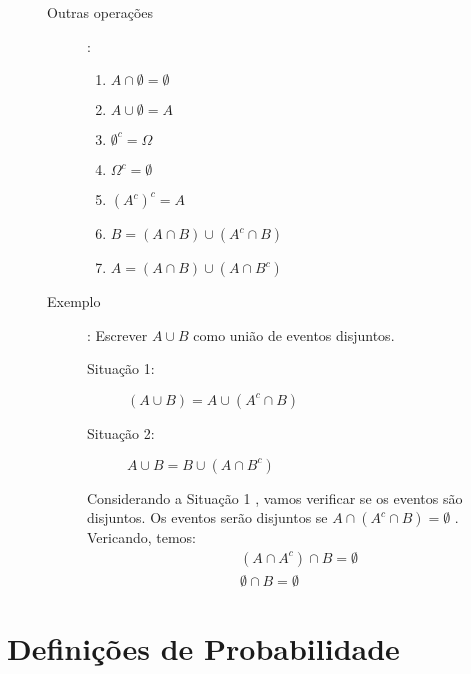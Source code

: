 \begin{description}
\begin{description}
\begin{enumerate}[align=left,label=({\alph*}) ]
      \end{enumerate}

    \item [Outras operações]: 

      \begin{enumerate}[leftmargin=*, label=\Roman*., widest=IV, align=left]
        \item     $A \cap \emptyset= \emptyset$ 
        \item     $A \cup \emptyset = A$ 
        \item     $\emptyset^{c} = \Omega$ 
        \item     $ \Omega^c = \emptyset$ 
        \item     $(A^c)^c = A$ 
        \item     $B= (A \cap B)\cup (A^c \cap B)$
        \item     $A= (A \cap B) \cup (A \cap B^c)$
      \end{enumerate}
    \item [Exemplo]: Escrever $A \cup B$ como união de eventos disjuntos.

      \begin{figure}[H]
        \centering
        
        \caption{}
        \label{fig:11}
      \end{figure}
      \begin{description}
        \item [Situação 1:]

          $(A \cup B) = A \cup (A^c \cap B)$

        \item      [Situação 2:]


          $A \cup B = B \cup (A \cap B^{c})$
      \end{description}

      Considerando a Situação 1 , vamos verificar se os eventos são disjuntos. Os eventos serão disjuntos se $A \cap ( A^c \cap B )= \emptyset$ . Vericando, temos: 
      \begin{align*}
        (A \cap A^c) \cap B = \emptyset \\
        \emptyset \cap B= \emptyset
      \end{align*}

  \end{description}
\end{description}
\section{Definições de Probabilidade}
